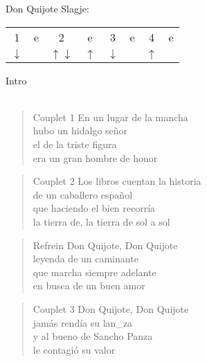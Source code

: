 \begin{song}{Don Quijote}
Slagje:
\begin{tabular}{cccccccc}
1 & e & 2 & e & 3 & e & 4 & e \\ 
$\downarrow$ &  & $\uparrow\downarrow$ & $\uparrow$ & $\downarrow$ &  & $\uparrow$ &  \\ 
\end{tabular} 

\begin{instrumental}{Intro}
\measure{}\measure*{}\\
\measure{}\measure*{\hspace{4.25em}:}\\
\measure{}\measure*{}
\end{instrumental}

\begin{verse}{Couplet 1}
En un lugar de la mancha\\
hubo un hidalgo señor\\
el de la triste figura\\
era un gran hombre de honor\\
\end{verse}

\begin{verse}{Couplet 2}
Los libros cuentan la historia\\
de un caballero español\\
que haciendo el bien recorría\\
la tierra de, la tierra de sol a sol  \hspace{5em}\\
\end{verse}

\begin{verse}{Refrein}
Don Quijote, Don Quijote\\
leyenda de un caminante\\
que marcha siempre adelante\\
en busca de un buen a\chord{}mor\\
\end{verse}
\clearpage
\begin{verse}{Couplet 3}
Don Quijote, Don Quijote\\
jamás rendía su lan\_za\\
y al bueno de Sancho Panza\\
le contagió su valor
\end{verse}


\end{song}
